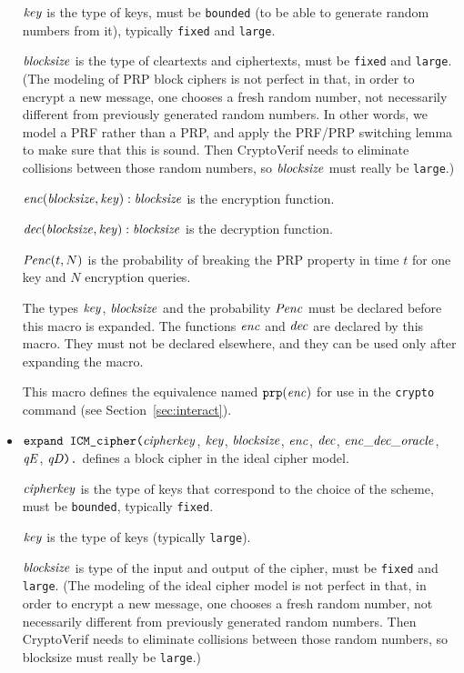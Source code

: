 \documentclass{article}
\begin{document}
\begin{itemize}
   $\mathit{key}$ is the type of keys, must be \texttt{bounded} (to be able to generate random numbers from it), typically \texttt{fixed} and \texttt{large}.

   $\mathit{blocksize}$ is the type of cleartexts and ciphertexts, must be
   \texttt{fixed} and \texttt{large}.
   (The modeling of PRP block ciphers is not perfect in that, in order
   to encrypt a new message, one chooses a fresh random number, not
   necessarily different from previously generated random numbers. In
   other words, we model a PRF rather than a PRP, and apply the
   PRF/PRP switching lemma to make sure that this is sound. Then
   CryptoVerif needs to eliminate collisions between those random
   numbers, so $\mathit{blocksize}$ must really be \texttt{large}.)

   $\mathit{enc}(\mathit{blocksize}, \mathit{key}): \mathit{blocksize}$ is the encryption function.

   $\mathit{dec}(\mathit{blocksize}, \mathit{key}): \mathit{blocksize}$ is the
  decryption function.

   $\mathit{Penc}(t, N)$ is the probability of breaking the PRP property
   in time $t$ for one key and $N$ encryption queries.

   The types $\mathit{key}$, $\mathit{blocksize}$ and the probability $\mathit{Penc}$ must
   be declared before this macro is expanded. The functions
   $\mathit{enc}$ and $\mathit{dec}$ are declared by this
   macro. They must not be declared elsewhere, and they can be used
   only after expanding the macro.

   This macro defines the equivalence named $\texttt{prp}(\mathit{enc})$
   for use in the \texttt{crypto} command 
   (see Section~\ref{sec:interact}).

\item $\texttt{expand ICM\_cipher(}\mathit{cipherkey}$, $\mathit{key}$, $\mathit{blocksize}$, $\mathit{enc}$,
$   \mathit{dec}$, $\mathit{enc\_dec\_oracle}$, $\mathit{qE}$, $\mathit{qD}\texttt{).}$
   defines a block cipher in the ideal cipher model.

   $\mathit{cipherkey}$ is the type of keys that correspond to the choice of the scheme, must be \texttt{bounded}, typically \texttt{fixed}.

   $\mathit{key}$ is the type of keys (typically \texttt{large}).

   $\mathit{blocksize}$ is type of the input and output of the cipher, 
   must be \texttt{fixed} and \texttt{large}.
   (The modeling of the ideal cipher model is not perfect in that, in
   order to encrypt a new message, one chooses a fresh random number,
   not necessarily different from previously generated random
   numbers. Then CryptoVerif needs to eliminate collisions between
   those random numbers, so blocksize must really be \texttt{large}.)


\end{itemize}
\end{document}

